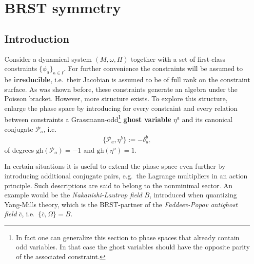 \section{BRST symmetry}\label{section:classical_brst}
\subsection{Introduction}

    Consider a dynamical system $(M,\omega,H)$ together with a set of first-class constraints $\{\phi_a\}_{a\in I}$. For further convenience the constraints will be assumed to be \textbf{irreducible}, i.e.~their Jacobian is assumed to be of full rank on the constraint surface. As was shown before, these constraints generate an algebra under the Poisson bracket. However, more structure exists. To explore this structure, enlarge the phase space by introducing for every constraint and every relation between constraints a Grassmann-odd\footnote{In fact one can generalize this section to phase spaces that already contain odd variables. In that case the ghost variables should have the opposite parity of the associated constraint.} \textbf{ghost variable} $\eta^a$ and its canonical conjugate $\mathcal{P}_a$, i.e.
    \begin{gather}
        \{\mathcal{P}_a,\eta^b\} := -\delta^b_a,
    \end{gather}
    of degrees $\mathrm{gh}(\mathcal{P}_a) = -1$ and $\mathrm{gh}(\eta^a) = 1$.
    \begin{remark}
        In certain situations it is useful to extend the phase space even further by introducing additional conjugate pairs, e.g.~the Lagrange multipliers in an action principle. Such descriptions are said to belong to the nonminimal sector. An example would be the \textit{Nakanishi-Lautrup field} $B$, introduced when quantizing Yang-Mills theory, which is the BRST-partner of the \textit{Faddeev-Popov antighost field} $\overline{c}$, i.e.~$\{\overline{c},\Omega\}=B$.
    \end{remark}

